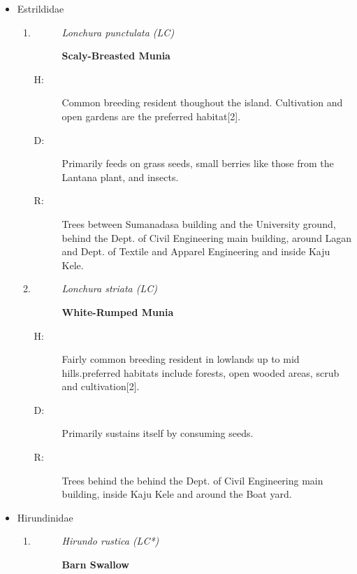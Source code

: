 \begin{itemize}
\begin{enumerate}
\begin{description}
\end{description}%
\end{enumerate}%
\item%
Estrildidae%
\begin{enumerate}%
\item%
\begin{description}%
\item[]%
\textit{Lonchura punctulata (LC)}%
\item[]%
\textbf{Scaly{-}Breasted Munia}%
\end{description}%
\begin{description}%
\item[H: ]%
Common breeding resident thoughout the island. Cultivation and open gardens are the preferred habitat{[}2{]}.%
\item[D: ]%
Primarily feeds on grass seeds, small berries like those from the Lantana plant, and insects.%
\item[R: ]%
Trees between Sumanadasa building and the University ground, behind the Dept. of Civil Engineering main building, around Lagan and Dept. of Textile and Apparel Engineering and inside Kaju Kele.%
\end{description}%
\item%
\begin{description}%
\item[]%
\textit{Lonchura striata (LC)}%
\item[]%
\textbf{White{-}Rumped Munia}%
\end{description}%
\begin{description}%
\item[H: ]%
Fairly common breeding resident in lowlands up to mid hills.preferred habitats include forests, open wooded areas, scrub and cultivation{[}2{]}.%
\item[D: ]%
Primarily sustains itself by consuming seeds.%
\item[R: ]%
Trees behind the behind the Dept. of Civil Engineering main building, inside Kaju Kele and around the Boat yard.%
\end{description}%
\end{enumerate}%
\item%
Hirundinidae%
\begin{enumerate}%
\item%
\begin{description}%
\item[]%
\textit{Hirundo rustica (LC*)}%
\item[]%
\textbf{Barn Swallow}%
\end{description}%

\end{enumerate}
\end{itemize}
